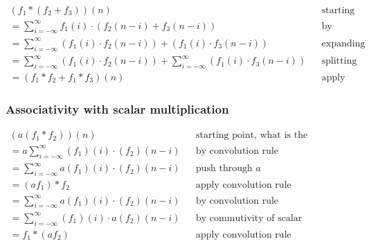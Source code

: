 \documentclass[11pt]{article}
\begin{document}
\begin{definition}
    \begin{align*}
        (f_1 \ast (f_2+f_3))(n)                                                                           &  & \text{starting point, what is the convoution at position n?} \\
        = \sum^\infty_{i=-\infty}f_1(i) \cdot (f_2(n-i)+f_3(n-i))                                         &  & \text{by convolution rule}                                   \\
        = \sum^\infty_{i=-\infty}(f_1(i) \cdot f_2(n-i))+(f_1(i) \cdot f_3(n-i))                          &  & \text{expanding parenthesis}                                 \\
        = \sum^\infty_{i=-\infty}(f_1(i) \cdot f_2(n-i)) + \sum^\infty_{i=-\infty}(f_1(i) \cdot f_3(n-i)) &  & \text{splitting summation}                                   \\
        = (f_1 \ast f_2+f_1 \ast f_3)(n)                                                                  &  & \text{apply convolution rule on both sums}
    \end{align*}
\end{definition}

\subsubsection{Associativity with scalar multiplication}

\begin{definition}
    \begin{align*}
        (a(f_1 \ast f_2))(n)                               &  & \text{starting point, what is the convoution at position n?} \\
        = a\sum^\infty_{i=-\infty}(f_1)(i)\cdot (f_2)(n-i) &  & \text{by convolution rule}                                   \\
        = \sum^\infty_{i=-\infty}a(f_1)(i)\cdot (f_2)(n-i) &  & \text{push through } a                                       \\
        = (af_1) \ast f_2                                  &  & \text{apply convolution rule}                                \\
        = \sum^\infty_{i=-\infty}a(f_1)(i)\cdot (f_2)(n-i) &  & \text{by convolution rule}                                   \\
        = \sum^\infty_{i=-\infty}(f_1)(i)\cdot a(f_2)(n-i) &  & \text{by commutivity of scalar multiplication}               \\
        = f_1 \ast (af_2)                                  &  & \text{apply convolution rule}
    \end{align*}
\end{definition}
\end{document}
